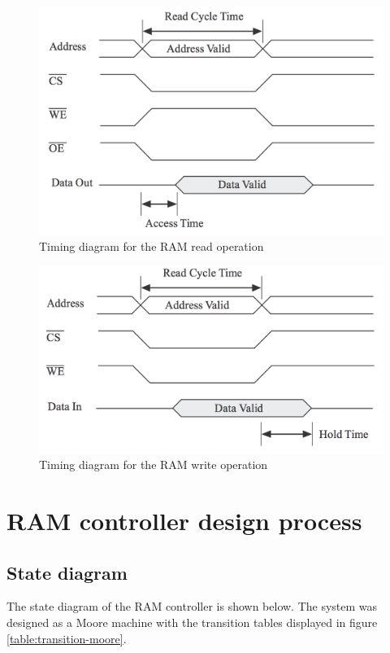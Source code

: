 \documentclass[11pt]{article}
\begin{document}
\begin{figure}[htpb]
	\centering
	\includegraphics[scale=0.5]{read}
	\caption{Timing diagram for the RAM read operation}
	\label{fig:read-timing}
\end{figure}

\begin{figure}[htpb]
	\centering
	\includegraphics[scale=0.5]{write}
	\caption{Timing diagram for the RAM write operation}
	\label{fig:write-timing}
\end{figure}

\section{RAM controller design process}
\subsection{State diagram}

The state diagram of the RAM controller is shown below. The system was designed as a Moore machine with the transition tables displayed in figure \ref{table:transition-moore}. 
\end{document}
